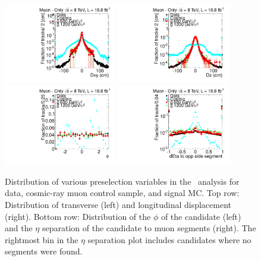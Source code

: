 \begin{figure}
\centering
  \includegraphics[clip=true, trim=0.0cm 0cm 2.8cm 0cm, width=0.44\textwidth]{figures/muonly/Selection_Comp_8TeV_Cosmic_Dxy_BS}
  \includegraphics[clip=true, trim=0.0cm 0cm 2.8cm 0cm, width=0.44\textwidth]{figures/muonly/Selection_Comp_8TeV_Cosmic_Dz_BS} \\
  \includegraphics[clip=true, trim=0.0cm 0cm 2.8cm 0cm, width=0.44\textwidth]{figures/muonly/Selection_Comp_8TeV_Cosmic_Phi_BS}
  \includegraphics[clip=true, trim=0.0cm 0cm 2.8cm 0cm, width=0.44\textwidth]{figures/muonly/Selection_Comp_8TeV_Cosmic_SegMinEtaSep_BS}
  \caption[Distribution of transverse and longitudinal displacement, $\phi$, and $\eta$ separation to muon segments
in the \muononly\ analysis for data, cosmic-ray muon control sample, and signal MC.]
{Distribution of various preselection variables in the \muononly\ analysis for data, cosmic-ray muon control sample, and signal MC.
Top row: Distribution of transverse (left) and longitudinal displacement (right).
Bottom row: Distribution of the $\phi$ of the candidate (left) and the $\eta$ separation of the candidate to muon segments (right). The rightmost bin in the
$\eta$ separation plot includes candidates where no segments were found.}
    \label{fig:MuOnlyPreselC}
\end{figure}

